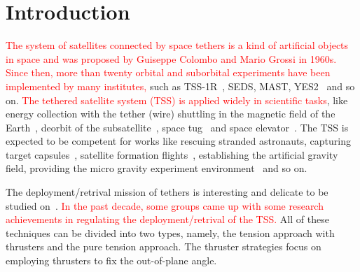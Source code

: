 \documentclass[3p]{elsarticle}
\theoremstyle{plain}
\begin{document}
\section{Introduction}
\textcolor{red}{The system of satellites connected by space tethers is a kind of artificial objects in space and was proposed by Guiseppe Colombo and Mario Grossi in 1960s. Since then, more than twenty orbital and suborbital experiments have been implemented by many institutes,} such as TSS-1R~\cite{lanoix2005effect}, SEDS, MAST, YES2~\cite{williams2012review} and so on.
\textcolor{red}{The tethered satellite system (TSS) is applied widely in scientific tasks}, like energy collection with the tether (wire) shuttling in the magnetic field of the Earth~\cite{lanoix2005effect}, deorbit of the subsatellite~\cite{khan2014analysis}, space tug~\cite{wen2016constrained} and space elevator~\cite{kojima2015mission}. The TSS is expected to be competent for works like rescuing stranded astronauts, capturing target capsules~\cite{huang2015adaptive}, satellite formation flights~\cite{hallaj2015tethered,alary2015dynamics}, establishing the artificial gravity field, providing the micro gravity experiment environment~\cite{chung2007nonlinear} and so on.\par
The deployment/retrival mission of tethers is interesting and delicate to be studied on~\cite{Fujii2012Deployment,steindl2014optimal,cai2014deployment,ma2014coordinated,jung2015nonlinear,li2016libration}.
\textcolor{red}{In the past decade, some groups came up with some research achievements in regulating the deployment/retrival of the TSS.}
All of these techniques can be divided into two types, namely, the tension approach with thrusters and the pure tension approach. The thruster strategies focus on employing thrusters to fix the out-of-plane angle.
\end{document}
